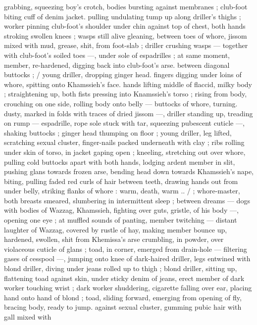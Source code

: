 grabbing, squeezing boy's crotch, bodies bursting against 
membranes ; club-foot biting cuff of denim jacket. pulling undulating 
tump up along driller's thighs ; worker pinning club-foot's shoulder 
under chin against top of chest, both hands stroking swollen knees 
; wasps still alive gleaning, between toes of whore, jissom mixed with 
mud, grease, shit, from foot-slab ; driller crushing wasps --- together 
with club-foot's soiled toes ---, under sole of espadrilles ; at same 
moment, member, re-hardened, digging back into club-foot's arse. 
between diagonal buttocks ; {\slash} young driller, dropping ginger head. 
fingers digging under loins of whore, spitting onto Khamssieh's face. 
hands lifting middle of flaccid, milky body ; straightening up, both 
fists pressing into Knamssieh's torso ; rising from body, crouching on 
one side, rolling body onto belly --- buttocks of whore, turning. 
dusty, marked in folds with traces of dried jissom ---, driller standing 
up, treading on rump --- espadrille, rope sole stuck with tar, 
squeezing pubescent cuticle ---, shaking buttocks ; ginger head 
thumping on floor ; young driller, leg lifted, scratching sexual cluster, 
finger-nails packed underneath with clay ; ribs rolling under skin of 
torso, in jacket gaping open ; kneeling, stretching out over whore, 
pulling cold buttocks apart with both hands, lodging ardent member 
in slit, pushing glans towards frozen arse, bending head down 
towards Khamssieh's nape, biting, pulling faded red curls of hair 
between teeth, drawing hands out from under belly, striking flanks of 
whore : {\gl}{\td} warm, death, warm ..{\gr} {\slash} ; whore-master, both breasts 
smeared, slumbering in intermittent sleep ; between dreams --- dogs 
with bodies of Wazzag, Khamssieh, fighting over guts, gristle, of his 
body ---, opening one eye ; at muffled sounds of panting, member 
twitching --- distant laughter of Wazzag, covered by rustle of hay, 
making member bounce up, hardened, swollen, shit from Khemissa's 
arse crumbling, in powder, over violaceous cuticle of glans ; toad, in 
corner, emerged from drain-hole --- filtering gases of cesspool ---, 
jumping onto knee of dark-haired driller, legs entwined with blond 
driller, diving under jeans rolled up to thigh ; blond driller, sitting up, 
flattening toad against skin, under sticky denim of jeans, erect 
member of dark worker touching wrist ; dark worker shuddering, 
cigarette falling over ear, placing hand onto hand of blond ; toad, 
sliding forward, emerging from opening of fly, bracing body, ready to 
jump. against sexual cluster, gumming pubic hair with gall mixed with 
